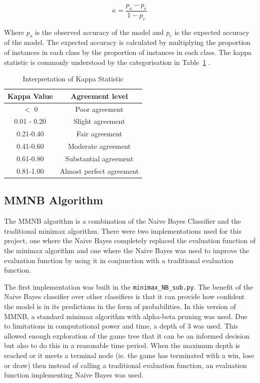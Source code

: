 \begin{equation}
    \label{eq:kappa_eq}
    \kappa = \frac{p_o - p_e}{1 - p_e}
\end{equation}

Where $p_o$ is the observed accuracy of the model and $p_e$ is the expected accuracy of the model. The expected accuracy is calculated by multiplying the proportion of instances in each class by the proportion of instances in each class. The kappa statistic is commonly understood by the categorisation in Table~\ref{tab:kappa} \cite{landisMeasurementObserverAgreement1977}. 




\begin{table}
    \centering
    \begin{tabular}{|c|c|}
        \hline
        \textbf{Kappa Value} & \textbf{Agreement level} \\
        \hline
        $<$ 0 & Poor agreement \\
        0.01 - 0.20 & Slight agreement \\
        0.21-0.40 & Fair agreement \\
        0.41-0.60 & Moderate agreement \\
        0.61-0.80 & Substantial agreement \\
        0.81-1.00 & Almost perfect agreement \\
        \hline
    \end{tabular}
    \caption{Interpretation of Kappa Statistic}
    \label{tab:kappa}

\end{table}



\subsection{MMNB Algorithm}

The MMNB algorithm is a combination of the Naive Bayes Classifier and the traditional minimax algorithm. There were two implementations used for this project, one where the Naive Bayes completely replaced the evaluation function of the minimax algorithm and one where the Naive Bayes was used to improve the evaluation function by using it in conjunction with a traditional evaluation function. 

The first implementation was built in the \texttt{minimax\_NB\_sub.py}. The benefit of the Naive Bayes classifier over other classifiers is that it can provide how confident the model is in its predictions in the form of probabilities. In this version of MMNB, a standard minimax algorithm with alpha-beta pruning was used. Due to limitations in computational power and time, a depth of 3 was used. This allowed enough exploration of the game tree that it can be an informed decision but also to do this in a reasonable time period. When the maximum depth is reached or it meets a terminal node (ie. the game has terminated with a win, lose or draw) then instead of calling a traditional evaluation function, an evaluation function implementing Naive Bayes was used. 

